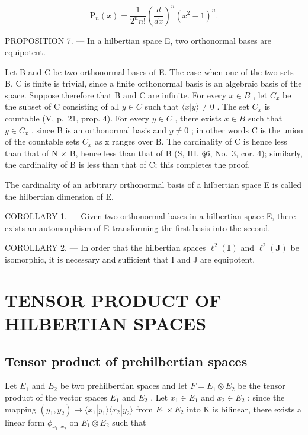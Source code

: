 \[
\mathrm{P} _ {n} (x) = \frac {1}{2 ^ {n} n !} \left(\frac {d}{d x}\right) ^ {n} (x ^ {2} - 1) ^ {n}.
\]

PROPOSITION 7. --- In a hilbertian space E, two orthonormal bases are equipotent.

Let B and C be two orthonormal bases of E. The case when one of the two sets B, C is finite is trivial, since a finite orthonormal basis is an algebraic basis of the space. Suppose therefore that B and C are infinite. For every \(x \in B\) , let \(C_{x}\) be the subset of C consisting of all \(y \in C\) such that \(\langle x | y \rangle \neq 0\) . The set \(C_{x}\) is countable (V, p.~21, prop. 4). For every \(y \in C\) , there exists \(x \in B\) such that \(y \in C_{x}\) , since B is an orthonormal basis and \(y \neq 0\) ; in other words C is the union of the countable sets \(C_{x}\) as x ranges over B. The cardinality of C is hence less than that of N × B, hence less than that of B (S, III, §6, No.~3, cor. 4); similarly, the cardinality of B is less than that of C; this completes the proof.

The cardinality of an arbitrary orthonormal basis of a hilbertian space E is called the hilbertian dimension of E.

COROLLARY 1. --- Given two orthonormal bases in a hilbertian space E, there exists an automorphism of E transforming the first basis into the second.

COROLLARY 2. --- In order that the hilbertian spaces \(\ell^2 (\mathbf{I})\) and \(\ell^2 (\mathbf{J})\) be isomorphic, it is necessary and sufficient that I and J are equipotent.

\section{TENSOR PRODUCT OF HILBERTIAN SPACES}

\subsection{Tensor product of prehilbertian spaces}

Let \(E_{1}\) and \(E_{2}\) be two prehilbertian spaces and let \(F = E_{1} \otimes E_{2}\) be the tensor product of the vector spaces \(E_{1}\) and \(E_{2}\) . Let \(x_{1} \in E_{1}\) and \(x_{2} \in E_{2}\) ; since the mapping \((y_{1}, y_{2}) \mapsto \langle x_{1}|y_{1} \rangle \langle x_{2}|y_{2} \rangle\) from \(E_{1} \times E_{2}\) into K is bilinear, there exists a linear form \(\phi_{x_{1},x_{2}}\) on \(E_{1} \otimes E_{2}\) such that

